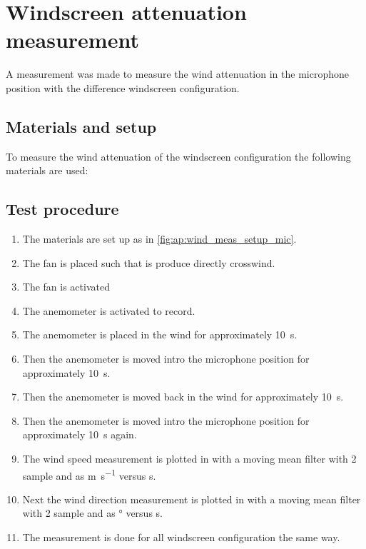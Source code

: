 \chapter{Windscreen attenuation measurement}
A measurement was made to measure the wind attenuation in the microphone position with the difference windscreen configuration.


\section*{Materials and setup}
To measure the wind attenuation of the windscreen configuration the following materials are used:

\startequipment
{}
\stopequipment




\section*{Test procedure}


\begin{enumerate}
\item The materials are set up as in \autoref{fig:ap:wind_meas_setup_mic}.
\item The fan is placed such that is produce directly crosswind.
\item The fan is activated 
\item The anemometer is activated to record.
\item The anemometer is placed in the wind for approximately \SI{10}{\second}.
\item Then the anemometer is moved intro the microphone position for approximately \SI{10}{\second}.
\item Then the anemometer is moved back in the wind for approximately \SI{10}{\second}.
\item Then the anemometer is moved intro the microphone position for approximately \SI{10}{\second} again. 
\item The wind speed measurement is plotted in \matlab with a moving mean filter with 2 sample and as \si{\meter\per\second} versus \si{\second}.
\item Next the wind direction measurement is plotted in \matlab with a moving mean filter with 2 sample and as \si{\degree} versus \si{\second}.
\item The measurement is done for all windscreen configuration the same way.
\end{enumerate}


